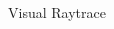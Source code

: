 \documentclass[final,hyperref={pdfpagelabels=false}]{beamer}
\begin{document}
\begin{frame}[t]
\begin{columns}[t]
\begin{column}{.96\textwidth}
\begin{block}{Visual Raytrace}
    
\end{block}

\end{column}

\begin{column}{.025\textwidth}\end{column} %

\end{columns} %



\begin{columns}[t] %

\begin{column}{.025\textwidth}\end{column} %

\begin{column}{.4675\textwidth} %



\end{column}
\end{columns}
\end{frame}
\end{document}
